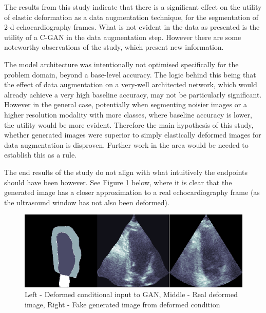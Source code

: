 The results from this study indicate that there is a significant effect on the
utility of elastic deformation as a data augmentation technique, for the
segmentation of 2-d echocardiography frames. What is not evident in the data as
presented is the utility of a C-GAN in the data augmentation step. However there
are some noteworthy observations of the study, which present new information.\newline

The model architecture was intentionally not optimised specifically for the
problem domain, beyond a base-level accuracy. The logic behind this being that
the effect of data augmentation on a very-well architected network, which would
already achieve a very high baseline accuracy, may not be particularly
significant. However in the general case, potentially when segmenting noisier
images or a higher resolution modality with more classes, where baseline
accuracy is lower, the utility would be more evident. Therefore the main
hypothesis of this study, whether generated images were superior to simply
elastically deformed images for data augmentation is disproven.
Further work in the area would be needed to establish this as a rule.
\newline

The end results of the study do not align with what intuitively the endpoints
should have been however. See Figure \ref{fig:conditional} below, where it is clear that the
generated image has a closer approximation to a real echocardiography frame (as
the ultrasound window has not also been deformed). \newline

\begin{figure}[H]
    \centering
    \includegraphics[width=1.0\textwidth]{figures/conditional.png}
    \caption{Left - Deformed conditional input to GAN, Middle - Real deformed image, Right - Fake generated image from deformed condition}
    \label{fig:conditional}
\end{figure}

